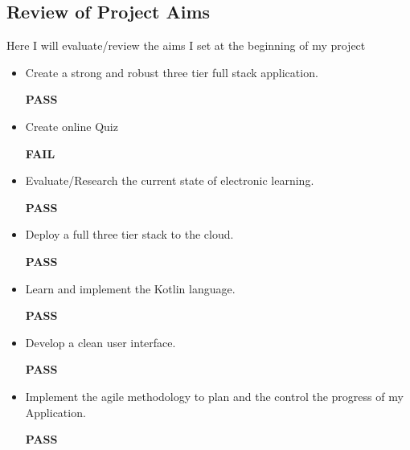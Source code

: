  \subsection{ Review of Project Aims}
Here I will evaluate/review  the aims I set at the beginning of my project
 
     \begin{itemize}
     \item Create a strong and robust  three tier full stack  application.

     \textbf{PASS}
         \end{itemize}
         
         
          \begin{itemize}
     \item Create online Quiz

     \textbf{FAIL}
         \end{itemize}
         
          \begin{itemize}
     \item Evaluate/Research the current state of electronic learning.

     \textbf{PASS}
         \end{itemize}
         
         
          \begin{itemize}
     \item Deploy a full three tier stack to the cloud.

     \textbf{PASS}
         \end{itemize}
         
         
         
          \begin{itemize}
     \item Learn and implement the Kotlin language.

     \textbf{PASS}
         \end{itemize}
         
         
         
          \begin{itemize}
     \item Develop a clean user interface.

     \textbf{PASS}
         \end{itemize}
         
         
    
     
       \begin{itemize}
     \item Implement the agile methodology to plan and the control the progress of my Application.

     \textbf{PASS}
         \end{itemize}
     
